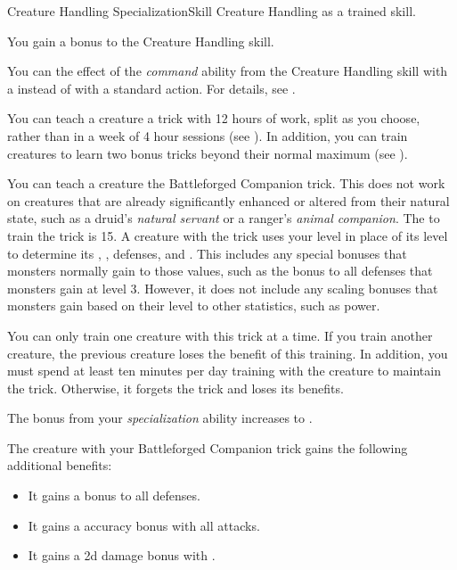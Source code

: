     \begin{feat}{Creature Handling Specialization}{Skill}
        \featpre Creature Handling as a trained skill.

         You gain a  bonus to the Creature Handling skill.

         You can  the effect of the \textit{command} ability from the Creature Handling skill with a  instead of with a standard action.
        For details, see .

         You can teach a creature a trick with 12 hours of work, split as you choose, rather than in a week of 4 hour sessions (see ).
        In addition, you can train creatures to learn two bonus tricks beyond their normal maximum (see ).

         You can teach a creature the Battleforged Companion trick.
        This does not work on creatures that are already significantly enhanced or altered from their natural state, such as a druid's \textit{natural servant} or a ranger's \textit{animal companion}.
        The  to train the trick is 15.
        A creature with the trick uses your level in place of its level to determine its , , defenses, and .
        This includes any special bonuses that monsters normally gain to those values, such as the  bonus to all defenses that monsters gain at level 3.
        However, it does not include any scaling bonuses that monsters gain based on their level to other statistics, such as power.

        You can only train one creature with this trick at a time.
        If you train another creature, the previous creature loses the benefit of this training.
        In addition, you must spend at least ten minutes per day training with the creature to maintain the trick.
        Otherwise, it forgets the trick and loses its benefits.

         The bonus from your \textit{specialization} ability increases to .

         The creature with your Battleforged Companion trick gains the following additional benefits:
        \begin{itemize}
            \item It gains a  bonus to all defenses.
            \item It gains a  accuracy bonus with all attacks.
            \item It gains a \plus2d damage bonus with .
        \end{itemize}
    \end{feat}

